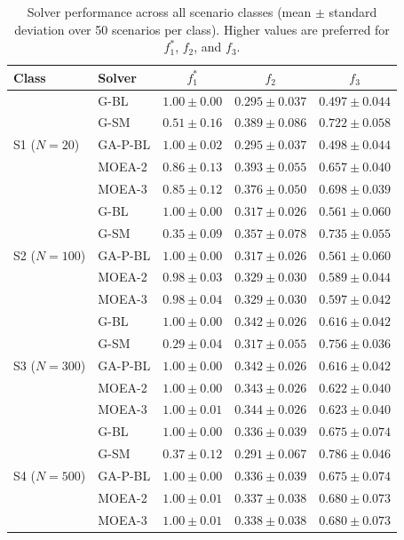 \documentclass[preprint,12pt,authoryear]{elsarticle}
\begin{document}
\begin{table}[H]
\centering
\small
\caption{Solver performance across all scenario classes (mean $\pm$ standard deviation over 50 scenarios per class). Higher values are preferred for $f_1^*$, $f_2$, and $f_3$.}
\label{tab:solver-profiles}
\begin{tabular}{llccc}
\toprule
\textbf{Class} & \textbf{Solver} & $f_1^*$ & $f_2$ & $f_3$ \\
\midrule
\multirow{5}{*}{S1 ($N=20$)}
 & G-BL    & $1.00 \pm 0.00$ & $0.295 \pm 0.037$ & $0.497 \pm 0.044$ \\
 & G-SM    & $0.51 \pm 0.16$ & $0.389 \pm 0.086$ & $0.722 \pm 0.058$ \\
 & GA-P-BL & $1.00 \pm 0.02$ & $0.295 \pm 0.037$ & $0.498 \pm 0.044$ \\
 & MOEA-2  & $0.86 \pm 0.13$ & $0.393 \pm 0.055$ & $0.657 \pm 0.040$ \\
 & MOEA-3  & $0.85 \pm 0.12$ & $0.376 \pm 0.050$ & $0.698 \pm 0.039$ \\
\midrule
\multirow{5}{*}{S2 ($N=100$)}
 & G-BL    & $1.00 \pm 0.00$ & $0.317 \pm 0.026$ & $0.561 \pm 0.060$ \\
 & G-SM    & $0.35 \pm 0.09$ & $0.357 \pm 0.078$ & $0.735 \pm 0.055$ \\
 & GA-P-BL & $1.00 \pm 0.00$ & $0.317 \pm 0.026$ & $0.561 \pm 0.060$ \\
 & MOEA-2  & $0.98 \pm 0.03$ & $0.329 \pm 0.030$ & $0.589 \pm 0.044$ \\
 & MOEA-3  & $0.98 \pm 0.04$ & $0.329 \pm 0.030$ & $0.597 \pm 0.042$ \\
\midrule
\multirow{5}{*}{S3 ($N=300$)}
 & G-BL    & $1.00 \pm 0.00$ & $0.342 \pm 0.026$ & $0.616 \pm 0.042$ \\
 & G-SM    & $0.29 \pm 0.04$ & $0.317 \pm 0.055$ & $0.756 \pm 0.036$ \\
 & GA-P-BL & $1.00 \pm 0.00$ & $0.342 \pm 0.026$ & $0.616 \pm 0.042$ \\
 & MOEA-2  & $1.00 \pm 0.00$ & $0.343 \pm 0.026$ & $0.622 \pm 0.040$ \\
 & MOEA-3  & $1.00 \pm 0.01$ & $0.344 \pm 0.026$ & $0.623 \pm 0.040$ \\
\midrule
\multirow{5}{*}{S4 ($N=500$)}
 & G-BL    & $1.00 \pm 0.00$ & $0.336 \pm 0.039$ & $0.675 \pm 0.074$ \\
 & G-SM    & $0.37 \pm 0.12$ & $0.291 \pm 0.067$ & $0.786 \pm 0.046$ \\
 & GA-P-BL & $1.00 \pm 0.00$ & $0.336 \pm 0.039$ & $0.675 \pm 0.074$ \\
 & MOEA-2  & $1.00 \pm 0.01$ & $0.337 \pm 0.038$ & $0.680 \pm 0.073$ \\
 & MOEA-3  & $1.00 \pm 0.01$ & $0.338 \pm 0.038$ & $0.680 \pm 0.073$ \\
\bottomrule
\end{tabular}
\end{table}
\end{document}

